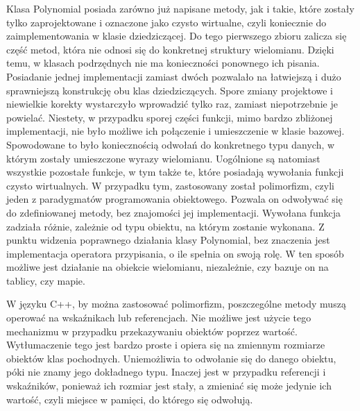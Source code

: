 Klasa Polynomial posiada zarówno już napisane metody, jak i takie, które zostały tylko zaprojektowane i oznaczone jako czysto wirtualne, czyli koniecznie do zaimplementowania w klasie dziedziczącej. Do tego pierwszego zbioru zalicza się część metod, która nie odnosi się do konkretnej struktury wielomianu. Dzięki temu, w klasach podrzędnych nie ma konieczności ponownego ich pisania. Posiadanie jednej implementacji zamiast dwóch pozwalało na łatwiejszą i dużo sprawniejszą konstrukcję obu klas dziedziczących. Spore zmiany projektowe i niewielkie korekty wystarczyło wprowadzić tylko raz, zamiast niepotrzebnie je powielać. Niestety, w przypadku sporej części funkcji, mimo bardzo zbliżonej implementacji, nie było możliwe ich połączenie i umieszczenie w klasie bazowej. Spowodowane to było koniecznością odwołań do konkretnego typu danych, w którym zostały umieszczone wyrazy wielomianu. Uogólnione są natomiast wszystkie pozostałe funkcje, w tym także te, które posiadają wywołania funkcji czysto wirtualnych. W przypadku tym, zastosowany został polimorfizm, czyli jeden z paradygmatów programowania obiektowego. Pozwala on odwoływać się do zdefiniowanej metody, bez znajomości jej implementacji. Wywołana funkcja zadziała różnie, zależnie od typu obiektu, na którym zostanie wykonana. Z punktu widzenia poprawnego działania klasy Polynomial, bez znaczenia jest implementacja operatora przypisania, o ile spełnia on swoją rolę. W ten sposób możliwe jest działanie na obiekcie wielomianu, niezależnie, czy bazuje on na tablicy, czy mapie.

W języku C++, by można zastosować polimorfizm, poszczególne metody muszą operować na wskaźnikach lub referencjach. Nie możliwe jest użycie tego mechanizmu w przypadku przekazywaniu obiektów poprzez wartość. Wytłumaczenie tego jest bardzo proste i opiera się na zmiennym rozmiarze obiektów klas pochodnych. Uniemożliwia to odwołanie się do danego obiektu, póki nie znamy jego dokładnego typu. Inaczej jest w przypadku referencji i wskaźników, ponieważ ich rozmiar jest stały, a zmieniać się może jedynie ich wartość, czyli miejsce w pamięci, do którego się odwołują.

